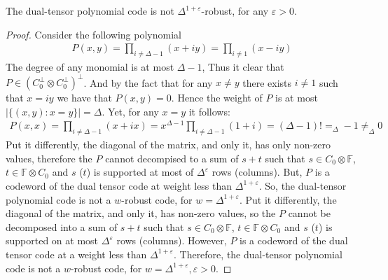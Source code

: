 \begin{claim}
  \label{claim:nowr} The dual-tensor polynomial code is not $\Delta^{1 +\varepsilon}$-robust, for any $\varepsilon > 0$.  
\end{claim}

\begin{proof}
Consider the following polynomial 
  \begin{equation*}
    \begin{split}
      P(x,y) = \prod_{i \neq \Delta - 1}{ \left( x + i y \right)  }=\prod_{i \neq  1}{ \left( x - i y \right)  }  
         \end{split}
  \end{equation*}
  The degree of any monomial is at most $\Delta-1$, Thus it clear that $P \in \left( C_{0}^{\perp} \otimes C_{0}^{\perp} \right)^{\perp}$. And by the fact that for any $x \neq y$ there exists $i\neq 1 $ such that $x = iy$ we have that $P(x,y) = 0$. Hence the weight of $P$ is at most $|\{ (x,y) : x = y \}|= \Delta$. Yet, for any $x = y$ it follows:      
  \begin{equation*}
    \begin{split}
       P(x,x) = \prod_{i \neq \Delta - 1}{ \left( x + i x \right)  }= x^{\Delta-1}\prod_{i \neq \Delta - 1}{ \left( 1 + i \right) } = \left( \Delta-1 \right)!  =_{\Delta} -1  \neq_{\Delta} 0 
    \end{split}
  \end{equation*}
  Put it differently, the diagonal of the matrix, and only it, has only non-zero values, therefore the $P$ cannot decompised to a sum of $s + t$ such that $s \in C_{0}\otimes \mathbb{F}$, $t \in \mathbb{F}\otimes C_{0}$ and $s$ ($t$) is supported at most of $\Delta^{\varepsilon}$ rows (columns). But, $P$ is a codeword of the dual tensor code at weight less than $\Delta^{1 + \varepsilon}$. So, the dual-tensor polynomial code is not a $w$-robust code,  for $w = \Delta^{1 +\varepsilon}$.   
  Put it differently, the diagonal of the matrix, and only it, has non-zero values, so the $P$ cannot be decomposed into a sum of $s + t$ such that $s \in C_{0}\otimes \mathbb{F}$, $t \in \mathbb{F}\otimes C_{0}$ and $s$ ($t$) is supported on at most $\Delta^{\varepsilon}$ rows (columns). However, $P$ is a codeword of the dual tensor code at a weight less than $\Delta^{1 + \varepsilon}$. Therefore, the dual-tensor polynomial code is not a $w$-robust code, for $w = \Delta^{1 +\varepsilon}, \varepsilon> 0 $.
\end{proof}

